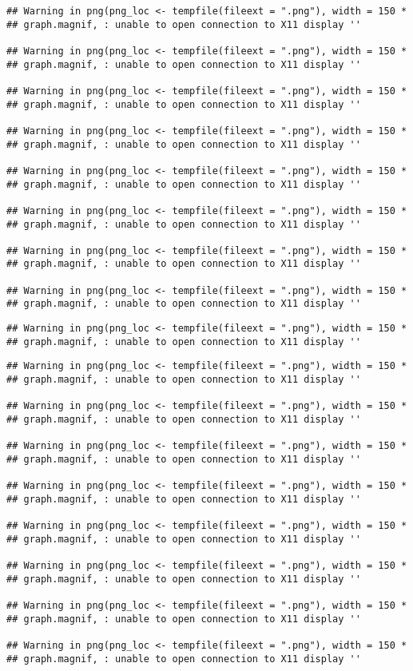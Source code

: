 \documentclass[]{article}
\begin{document}
\begin{verbatim}
## Warning in png(png_loc <- tempfile(fileext = ".png"), width = 150 *
## graph.magnif, : unable to open connection to X11 display ''

## Warning in png(png_loc <- tempfile(fileext = ".png"), width = 150 *
## graph.magnif, : unable to open connection to X11 display ''

## Warning in png(png_loc <- tempfile(fileext = ".png"), width = 150 *
## graph.magnif, : unable to open connection to X11 display ''

## Warning in png(png_loc <- tempfile(fileext = ".png"), width = 150 *
## graph.magnif, : unable to open connection to X11 display ''

## Warning in png(png_loc <- tempfile(fileext = ".png"), width = 150 *
## graph.magnif, : unable to open connection to X11 display ''

## Warning in png(png_loc <- tempfile(fileext = ".png"), width = 150 *
## graph.magnif, : unable to open connection to X11 display ''

## Warning in png(png_loc <- tempfile(fileext = ".png"), width = 150 *
## graph.magnif, : unable to open connection to X11 display ''

## Warning in png(png_loc <- tempfile(fileext = ".png"), width = 150 *
## graph.magnif, : unable to open connection to X11 display ''
\end{verbatim}

\begin{verbatim}
## Warning in png(png_loc <- tempfile(fileext = ".png"), width = 150 *
## graph.magnif, : unable to open connection to X11 display ''
\end{verbatim}

\begin{verbatim}
## Warning in png(png_loc <- tempfile(fileext = ".png"), width = 150 *
## graph.magnif, : unable to open connection to X11 display ''

## Warning in png(png_loc <- tempfile(fileext = ".png"), width = 150 *
## graph.magnif, : unable to open connection to X11 display ''

## Warning in png(png_loc <- tempfile(fileext = ".png"), width = 150 *
## graph.magnif, : unable to open connection to X11 display ''

## Warning in png(png_loc <- tempfile(fileext = ".png"), width = 150 *
## graph.magnif, : unable to open connection to X11 display ''

## Warning in png(png_loc <- tempfile(fileext = ".png"), width = 150 *
## graph.magnif, : unable to open connection to X11 display ''

## Warning in png(png_loc <- tempfile(fileext = ".png"), width = 150 *
## graph.magnif, : unable to open connection to X11 display ''

## Warning in png(png_loc <- tempfile(fileext = ".png"), width = 150 *
## graph.magnif, : unable to open connection to X11 display ''

## Warning in png(png_loc <- tempfile(fileext = ".png"), width = 150 *
## graph.magnif, : unable to open connection to X11 display ''
\end{verbatim}
\end{document}
